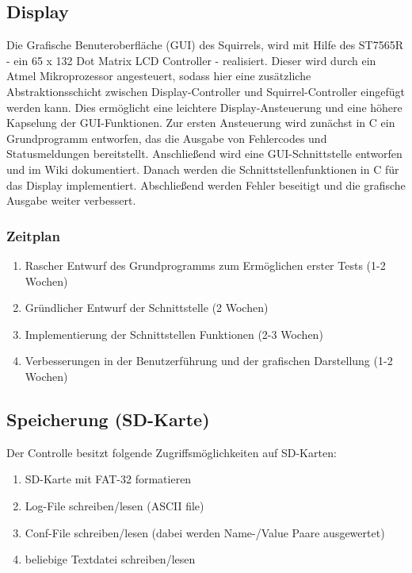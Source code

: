 \documentclass[12pt,a4paper]{article}
\begin{document}
\subsection{Display}

Die Grafische Benuteroberfläche (GUI) des Squirrels, wird mit Hilfe des ST7565R - ein 65 x 132 Dot Matrix LCD Controller - realisiert.
Dieser wird durch ein Atmel Mikroprozessor angesteuert, sodass hier eine zusätzliche Abstraktionsschicht zwischen Display-Controller und Squirrel-Controller eingefügt werden kann. Dies ermöglicht eine leichtere Display-Ansteuerung und eine höhere Kapselung der GUI-Funktionen.
Zur ersten Ansteuerung wird zunächst in C ein Grundprogramm entworfen, das die Ausgabe von Fehlercodes und Statusmeldungen bereitstellt.
Anschließend wird eine GUI-Schnittstelle entworfen und im Wiki dokumentiert.
Danach werden die Schnittstellenfunktionen in C für das Display implementiert.
Abschließend werden Fehler beseitigt und die grafische Ausgabe weiter verbessert.

\subsubsection{Zeitplan}

\begin{enumerate}
	\item Rascher Entwurf des Grundprogramms zum Ermöglichen erster Tests (1-2 Wochen)
	\item Gründlicher Entwurf der Schnittstelle (2 Wochen)
	\item Implementierung der Schnittstellen Funktionen (2-3 Wochen)
	\item Verbesserungen in der Benutzerführung und der grafischen Darstellung (1-2 Wochen)
\end{enumerate}

\subsection{Speicherung (SD-Karte)}

Der Controlle besitzt folgende Zugriffsmöglichkeiten auf SD-Karten:

\begin{enumerate}
	\item SD-Karte mit FAT-32 formatieren
	\item Log-File schreiben/lesen (ASCII file)
	\item Conf-File schreiben/lesen (dabei werden Name-/Value Paare ausgewertet)
	\item beliebige Textdatei schreiben/lesen
\end{enumerate}
\end{document}
